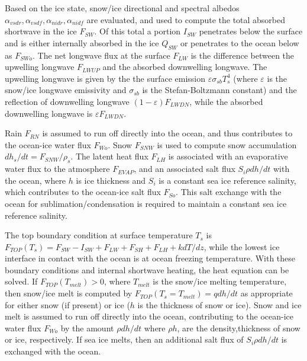 Based on the ice state, snow/ice directional and spectral albedos $\alpha_{vsdr},
\alpha_{vsdf},\alpha_{nidr},\alpha_{nidf}$ are evaluated, and used to compute the
total absorbed shortwave in the ice $F_{SW}$. Of this total a portion $I_{SW}$ 
penetrates below the surface and is either internally absorbed in the ice 
$Q_{SW}$ or penetrates to the ocean below as $F_{SWo}$. The net longwave flux at 
the surface $F_{LW}$ is the difference between the upwelling longwave $F_{LWUP}$
and the absorbed downwelling longwave. The upwelling longwave is given by the
the surface emission $\varepsilon \sigma_{sb} T_s^4$ (where $\varepsilon$ is the 
snow/ice longwave emissivity and $\sigma_{sb}$ is the Stefan-Boltzmann constant) 
and the reflection of downwelling longwave $(1-\varepsilon) F_{LWDN}$, while the 
absorbed downwelling longwave is $\varepsilon F_{LWDN}$.

Rain $F_{RN}$ is assumed to run off directly into the ocean, and thus 
contributes to the ocean-ice water flux $F_{Wo}$. Snow $F_{SNW}$ 
is used to compute snow accumulation $dh_s/dt = F_{SNW} / \rho_s$. 
The latent heat flux $F_{LH}$ is associated with an evaporative
water flux to the atmosphere $F_{EVAP}$, and an associated salt
flux $S_i \rho dh/dt$ with the ocean, where $h$ is ice thickness and $S_i$ 
is a constant sea ice reference salinity, which contributes to the
ocean-ice salt flux $F_{So}$. This salt exchange with the
ocean for sublimation/condensation is required to maintain a constant 
sea ice reference salinity.

The top boundary condition at surface temperature $T_s$ is
$F_{TOP}(T_s) = F_{SW}-I_{SW} + F_{LW} + F_{SH} + F_{LH} + k dT/dz$, while 
the lowest ice interface in contact with the ocean is at ocean freezing 
temperature. With these boundary conditions and internal shortwave heating,
the heat equation can be solved. If $F_{TOP}(T_{melt}) > 0$, where $T_{melt}$ 
is the snow/ice melting temperature, then snow/ice melt is computed by 
$F_{TOP}(T_s=T_{melt}) = q dh/dt$ as appropriate for either snow (if present) 
or ice ($h$ is the thickness of snow or ice). Snow and ice melt is assumed to run 
off directly into the ocean, contributing to the ocean-ice water flux $F_{Wo}$ 
by the amount $\rho dh/dt$ where $\rho h$, are the density,thickness of snow or 
ice, respectively. If sea ice melts, then an additional salt flux of 
$S_i \rho dh/dt$ is exchanged with the ocean.

